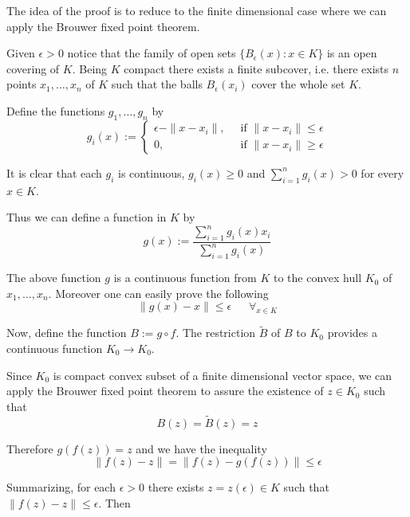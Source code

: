 \documentclass[12pt]{article}
\begin{document}
The idea of the proof is to reduce to the finite dimensional case where we can apply the Brouwer fixed point theorem.

Given $\epsilon>0$ notice that the family of open sets $\{ B_\epsilon(x)\colon x\in K\}$ is an open covering of $K$. Being $K$ compact there exists a finite subcover, i.e. there exists $n$ points $x_1,\ldots, x_n$ of $K$ such that the balls $B_\epsilon(x_i)$ cover the whole set $K$. 

Define the functions $g_1, \ldots, g_n$ by
\begin{displaymath}
g_i(x):=
\begin{cases}
\epsilon -\|x-x_i\|, & \;\;\textrm{if $\|x-x_i\| \leq \epsilon$} \\
0, & \;\;\textrm{if $\|x-x_i\| \geq \epsilon$}
\end{cases}
\end{displaymath}

It is clear that each $g_i$ is continuous, $g_i(x) \geq 0$ and $\sum_{i=1}^n g_i(x) > 0$ for every $x \in K$.

Thus we can define a function in $K$ by
\begin{displaymath}
g(x):= \frac{\sum_{i=1}^n g_i(x) x_i}{\sum_{i=1}^n g_i(x)}
\end{displaymath}

The above function $g$ is a continuous function from $K$ to the convex hull $K_0$ of $x_1, \ldots, x_n$. Moreover one can easily prove the following 
\begin{displaymath}
\|g(x)-x\| \leq \epsilon \quad\;\; \forall_{x \in K}
\end{displaymath}

Now, define the function $B:=g \circ f$. The restriction $\tilde{B}$ of $B$ to $K_0$ provides a continuous function $K_0 \longrightarrow K_0$.

Since $K_0$ is compact convex subset of a finite dimensional vector space, we can apply the Brouwer fixed point theorem to assure the existence of $z \in K_0$  such that
\begin{displaymath}
B(z) = \tilde{B}(z) = z
\end{displaymath}

Therefore $g(f(z)) = z$ and we have the inequality
\begin{displaymath}
\|f(z) - z\| = \|f(z) - g(f(z))\| \leq \epsilon
\end{displaymath}

Summarizing, for each $\epsilon >0$ there exists $z = z(\epsilon) \in K$ such that $\|f(z) - z\| \leq \epsilon$. Then
\end{document}
